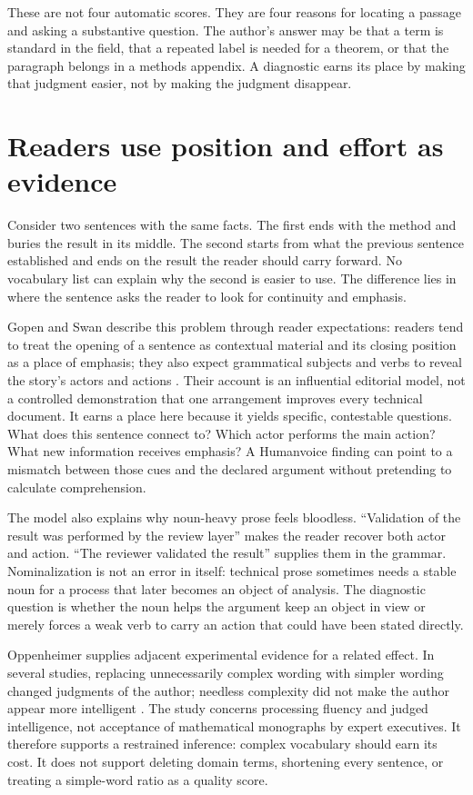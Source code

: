 These are not four automatic scores. They are four reasons for locating a
passage and asking a substantive question. The author's answer may be that a
term is standard in the field, that a repeated label is needed for a theorem,
or that the paragraph belongs in a methods appendix. A diagnostic earns its
place by making that judgment easier, not by making the judgment disappear.

\section{Readers use position and effort as evidence}
\label{sec:lit-reader-expectations}

Consider two sentences with the same facts. The first ends with the method and
buries the result in its middle. The second starts from what the previous
sentence established and ends on the result the reader should carry forward.
No vocabulary list can explain why the second is easier to use. The difference
lies in where the sentence asks the reader to look for continuity and emphasis.

Gopen and Swan describe this problem through reader expectations: readers tend
to treat the opening of a sentence as contextual material and its closing
position as a place of emphasis; they also expect grammatical subjects and
verbs to reveal the story's actors and actions
\citep{gopen1990science}. Their account is an influential editorial model, not
a controlled demonstration that one arrangement improves every technical
document. It earns a place here because it yields specific, contestable
questions. What does this sentence connect to? Which actor performs the main
action? What new information receives emphasis? A Humanvoice finding can point
to a mismatch between those cues and the declared argument without pretending
to calculate comprehension.

The model also explains why noun-heavy prose feels bloodless. ``Validation of
the result was performed by the review layer'' makes the reader recover both
actor and action. ``The reviewer validated the result'' supplies them in the
grammar. Nominalization is not an error in itself: technical prose sometimes
needs a stable noun for a process that later becomes an object of analysis.
The diagnostic question is whether the noun helps the argument keep an object
in view or merely forces a weak verb to carry an action that could have been
stated directly.

Oppenheimer supplies adjacent experimental evidence for a related effect. In
several studies, replacing unnecessarily complex wording with simpler wording
changed judgments of the author; needless complexity did not make the author
appear more intelligent \citep{oppenheimer2006erudite}. The study concerns
processing fluency and judged intelligence, not acceptance of mathematical
monographs by expert executives. It therefore supports a restrained inference:
complex vocabulary should earn its cost. It does not support deleting domain
terms, shortening every sentence, or treating a simple-word ratio as a quality
score.

